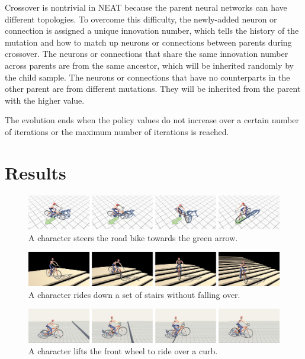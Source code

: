 Crossover is nontrivial in NEAT because the parent neural networks can have different topologies. To overcome this difficulty, the newly-added neuron or connection is assigned a unique innovation number, which tells the history of the mutation and how to match up neurons or connections between parents during crossover. The neurons or connections that share the same innovation number across parents are from the same ancestor, which will be inherited randomly by the child sample. The neurons or connections that have no counterparts in the other parent are from different mutations. They will be inherited from the parent with the higher value.

The evolution ends when the policy values do not increase over a certain number of iterations or the maximum number of iterations is reached.

\section{Results}
\label{sec:results}


\begin{figure}[!t]
\centering
\includegraphics[width=\textwidth]{figures/maneuver}
\caption{A character steers the road bike towards the green arrow.}
\label{fig:balance}
\end{figure}

\begin{figure}[!t]
\centering
\includegraphics[width=\textwidth]{figures/staircase}
\caption{A character rides down a set of stairs without falling over.}
\label{fig:stair}
\end{figure}

\begin{figure}[!t]
\centering
\includegraphics[width=\textwidth]{figures/Curb}
\caption{A character lifts the front wheel to ride over a curb.}
\label{fig:curb}
\end{figure}

